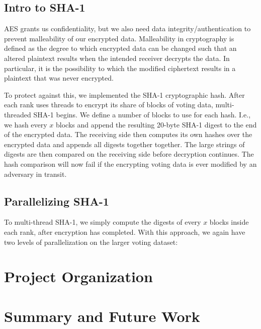 \documentclass[final,5p,times,twocolumn,authoryear, 10pt]{elsarticle}
\begin{document}
\subsection{Intro to SHA-1}

AES grants us confidentiality, but we also need data integrity/authentication to prevent malleability of our encrypted data.
Malleability in cryptography is defined as the degree to which encrypted data can be changed such that an altered plaintext results
when the intended receiver decrypts the data. In particular, it is the possibility to which the modified ciphertext results in a plaintext
that was never encrypted.

To protect against this, we implemented the SHA-1 cryptographic hash. After each rank uses threads to encrypt its share of blocks of voting data,
multi-threaded SHA-1 begins. We define a number of blocks to use for each hash. I.e., we hash every $x$ blocks and append the resulting 20-byte SHA-1
digest to the end of the encrypted data. The receiving side then computes its own hashes over the encrypted data and appends all digests together
together. The large strings of digests are then compared on the receiving side before decryption continues. The hash comparison will now fail if
the encrypting voting data is ever modified by an adversary in transit. 

\subsection{Parallelizing SHA-1}

To multi-thread SHA-1, we simply compute the digests of every $x$ blocks inside each rank, after encryption has completed. With this approach, we again
have two levels of parallelization on the larger voting dataset: 

\section{Project Organization}
\label{Project Organization}


\section{Summary and Future Work}
\label{Summary and Future Work}



%  
% 
\end{document}
